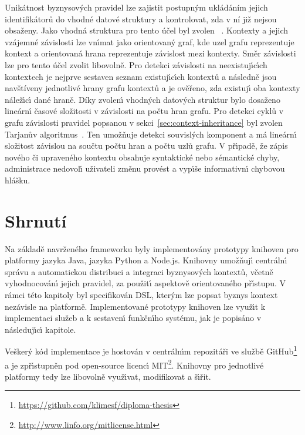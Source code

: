 Unikátnost byznysových pravidel lze zajistit postupným ukládáním jejich identifikátorů
do vhodné datové struktury a kontrolovat, zda v ní již nejsou obsaženy. Jako vhodná struktura
pro tento účel byl zvolen ~\cite{hopcroft1983data}.
Kontexty a jejich vzájemné závislosti lze vn\'{\i}mat jako
orientovan\'y graf, kde uzel grafu reprezentuje kontext
a orientovaná hrana reprezentuje závislost mezi kontexty.
Směr závislosti lze pro tento účel zvolit libovolně.
Pro detekci závislosti na neexistuj\'{\i}c\'{\i}ch kontextech je nejprve
sestaven seznam existuj\'{\i}c\'{\i}ch kontextů a následně jsou navštíveny
jednotlivé hrany grafu kontextů a je ověřeno, zda existuj\'{\i} oba kontexty
nálež\'{\i}c\'{\i} dané hraně. Díky zvolen\'{\i} vhodn\'ych datov\'ych struktur
bylo dosaženo lineárn\'{\i} časové složitosti v závislosti na počtu hran grafu.
Pro detekci cyklů v grafu závislosti pravidel popsanou v sekci~\ref{sec:context-inheritance} byl
zvolen Tarjanův algoritmus~\cite{tarjan1971depth}. Ten umožňuje detekci souvisl\'ych
komponent a má lineárn\'{\i} složitost závislou na součtu počtu hran a
počtu uzlů grafu. V př\'{\i}padě, že zápis nového či upraveného kontextu obsahuje syntaktické
nebo sémantické chyby, administrace nedovol\'{\i} uživateli změnu provést a vyp\'{\i}še informativn\'{\i}
chybovou hlášku.

\section{Shrnutí}

Na základě navrženého frameworku byly implementovány prototypy
knihoven pro platformy jazyka Java, jazyka Python a
Node.js. Knihovny umožňuj\'{\i} centráln\'{\i} správu a automatickou distribuci a integraci
byznysov\'ych kontextů, včetně vyhodnocován\'{\i} jejich pravidel, za
použit\'{\i} aspektově orientovaného př\'{\i}stupu.
V rámci této kapitoly byl specifikován \gls{DSL}, kter\'ym lze popsat
byznys kontext nezávisle na platformě.
Implementované prototypy knihoven lze využ\'{\i}t k implementaci služeb a k sestaven\'{\i}
funkčn\'{\i}ho systému, jak je popisáno v následuj\'{\i}c\'{\i} kapitole.

Vešker\'y kód implementace je hostován v centráln\'{\i}m repozitáři
ve službě GitHub\footnote{\url{https://github.com/klimesf/diploma-thesis}}
a je zpř\'{\i}stupněn pod open-source licenc\'{\i} \gls{MIT}\footnote{\url{http://www.linfo.org/mitlicense.html}}.
Knihovny pro jednotlivé platformy tedy lze libovolně
využ\'{\i}vat, modifikovat a š\'{\i}řit.
